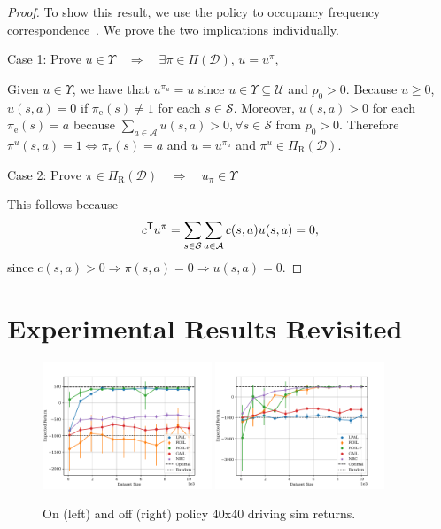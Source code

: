 \documentclass[10pt]{article}
\renewcommand{\cite}{\citep}
\theoremstyle{plain}
\theoremstyle{remark}
\begin{document}
\lemmaOccupancyExistance*
\begin{proof}
To show this result, we use the policy to occupancy frequency correspondence~\cite{Puterman1994}. We prove the two implications individually.

Case 1: Prove $u \in \Upsilon   \quad \Rightarrow \quad  \exists
        \pi \in \Pi(\mathcal{D}), \, u = u^{\pi}$,

Given $u \in \Upsilon$, we have that $u^{\pi_{u}} = u$ since $u\in \Upsilon \subseteq \mathcal{U}$ and $p_0 > 0$. Because $u \ge 0$, $u(s,a) = 0$ if $\pi_{\mathrm{e}}(s) \neq 1$ for each $s\in \mathcal{S}$. Moreover, $u(s,a) > 0$ for each $\pi_{\mathrm{e}}(s) = a$ because $\sum_{a\in \mathcal{A}} u(s,a) > 0, \forall s\in \mathcal{S}$ from $p_0 > 0$. Therefore $\pi^u(s,a) = 1 \Leftrightarrow \pi_{\mathrm{r}}(s) = a$ and $u = u^{\pi_{u}}$ and $\pi^u\in \Pi_{\mathrm{R}}(\mathcal{D})$.

Case 2: Prove $\pi \in \Pi_{\mathrm{R}}(\mathcal{D}) \quad \Rightarrow \quad  u_{\pi} \in
        \Upsilon $

        This follows because
\[
 c^{\mathsf{T}} u^{\pi} = \sum_{s\in \mathcal{S}} \sum_{a\in \mathcal{A}} c(s,a) u(s,a) = 0, 
\]
since $c(s,a) > 0 \Rightarrow \pi(s,a) = 0 \Rightarrow u(s,a) = 0$.
\end{proof}

\section{Experimental Results Revisited}
\label{sec:experimental_results_revisited}
\begin{figure}
	\centering
	\includegraphics[width=0.45\textwidth]{../src/plots/returns/40x40_driving_on_policy_returns.pdf}
	\includegraphics[width=0.45\textwidth]{../src/plots/returns/40x40_driving_off_policy_returns.pdf}
	\caption{On (left) and off (right) policy 40x40 driving sim returns.}
	\label{fig:driving}
\end{figure}
\end{document}

